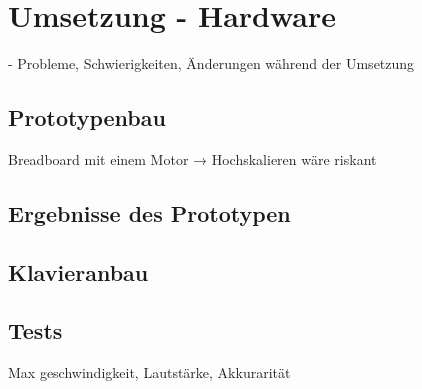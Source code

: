 \chapter{Umsetzung - Hardware} \label{umsetzung}

\nocite{*}
- Probleme, Schwierigkeiten, Änderungen während der Umsetzung

\section{Prototypenbau}
Breadboard mit einem Motor → Hochskalieren wäre riskant
\section{Ergebnisse des Prototypen}
\section{Klavieranbau}
\section{Tests}
Max geschwindigkeit, Lautstärke, Akkurarität
